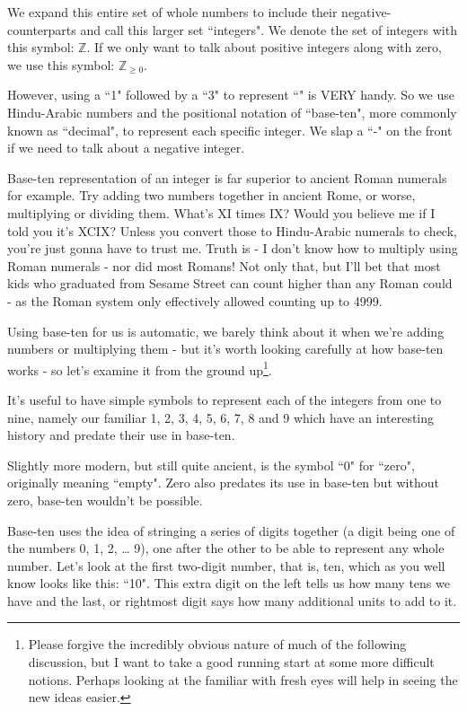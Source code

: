 \documentclass{article}
\begin{document}
We expand this entire set of whole numbers to include their
negative-counterparts and call this larger set ``integers".
We denote the set of integers with this symbol: $\mathbb{Z}$.
If we only want to talk about positive integers along with zero,
we use this symbol: $\mathbb{Z}_{\ge 0}$.

However, using a ``1" followed by a ``3" to represent
``\faApple{}\faApple{}\faApple{}\faApple{}\faApple{}\faApple{}\faApple{}\faApple{}\faApple{}\faApple{}\faApple{}\faApple{}\faApple{}"
is VERY handy. So we use Hindu-Arabic numbers and the positional notation of ``base-ten",
more commonly known as ``decimal", to represent each specific integer.
We slap a ``-" on the front if we need to talk about a negative integer.

Base-ten representation of an integer is far superior to ancient Roman numerals for example.
Try adding two numbers together in ancient Rome, or worse,
multiplying or dividing them.
What's XI times IX? Would you believe me if I told
you it's XCIX? Unless you convert those to Hindu-Arabic numerals to check,
you're just gonna have to trust me.
Truth is - I don't know how to multiply using Roman
numerals - nor did most Romans! Not only that,
but I'll bet that most kids who graduated from Sesame Street
can count higher than any Roman could - as the
Roman system only effectively allowed counting up to 4999.

Using base-ten for us is automatic,
we barely think about it when we're adding numbers or multiplying
them - but it's worth looking carefully at how base-ten
works - so let's examine it from the ground up\footnote{Please forgive the incredibly obvious nature of much
of the following discussion, but I want to take a good running start
at some more difficult notions. Perhaps looking at the familiar with fresh eyes will help in seeing the new ideas easier.}.

It's useful to have simple symbols to represent each of the integers from one to nine,
namely our familiar 1, 2, 3, 4, 5, 6, 7, 8 and 9
which have an interesting history and predate their use in base-ten.

Slightly more modern, but still quite ancient,
is the symbol ``0" for ``zero", originally meaning ``empty".
Zero also predates its use in base-ten but without zero,
base-ten wouldn't be possible.

Base-ten uses the idea of stringing a series of digits together
(a digit being one of the numbers 0, 1, 2, \dots{} 9),
one after the other to be able to represent any whole number.
Let's look at the first two-digit number, that is, ten,
which as you well know looks like this: ``10".
This extra digit on the left tells us how many tens we have and the last,
or rightmost digit says how many additional units to add to it.
\end{document}
